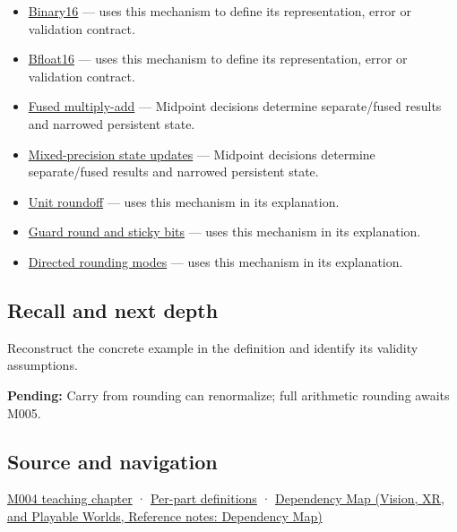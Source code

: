 \begin{itemize}
\item
  \hyperref[appendix-34443cec7170]{Binary16} --- uses this mechanism to define its representation, error or validation contract.
\item
  \hyperref[appendix-18b8dd966b5d]{Bfloat16} --- uses this mechanism to define its representation, error or validation contract.
\item
  \hyperref[appendix-41e8ef22a21e]{Fused multiply-add} --- Midpoint decisions determine separate/fused results and narrowed persistent state.
\item
  \hyperref[appendix-260182e617b7]{Mixed-precision state updates} --- Midpoint decisions determine separate/fused results and narrowed persistent state.
\item
  \hyperref[appendix-bc44f7b42f42]{Unit roundoff} --- uses this mechanism in its explanation.
\item
  \hyperref[appendix-b572b631069b]{Guard round and sticky bits} --- uses this mechanism in its explanation.
\item
  \hyperref[appendix-637d164ae5ca]{Directed rounding modes} --- uses this mechanism in its explanation.
\end{itemize}

\subsection{Recall and next depth}\label{appendix-614afe1de592-recall-and-next-depth}

\hypertarget{appendix-614afe1de592-recall-and-next-depth}{}

Reconstruct the concrete example in the definition and identify its validity assumptions.

\textbf{Pending:} Carry from rounding can renormalize; full arithmetic rounding awaits M005.

\subsection{Source and navigation}\label{appendix-614afe1de592-source-and-navigation}

\hypertarget{appendix-614afe1de592-source-and-navigation}{}

\hyperref[01-foundations-i-ch001-a-stretching-ruler-for-real-valued-quantities]{M004 teaching chapter} · \hyperref[appendix-fd090d982a15-m004---parts-61-76]{Per-part definitions} · \href{../07-Vision-XR-and-Playable-Worlds/main.pdf\#nameddest=appendix-4ad47bdd269a}{Dependency Map (Vision, XR, and Playable Worlds, Reference notes: Dependency Map)}
